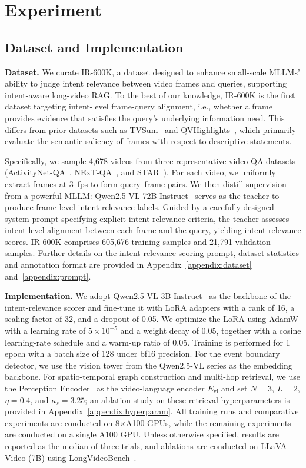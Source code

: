\section{Experiment}


\subsection{Dataset and Implementation}
\noindent\textbf{Dataset.} We curate IR-600K, a  dataset designed to enhance small-scale MLLMs’ ability to judge intent relevance between video frames and queries, supporting intent-aware long-video RAG. To the best of our knowledge, IR-600K is the first dataset targeting intent-level frame-query alignment, i.e., whether a frame provides evidence that satisfies the query’s underlying information need. This differs from prior datasets such as TVSum~\cite{tvs} and QVHighlights~\cite{qah}, which primarily evaluate the semantic saliency of frames with respect to descriptive statements. 

Specifically, we sample 4,678 videos from three representative video QA datasets (ActivityNet-QA~\cite{A-QA}, NExT-QA~\cite{N-QA}, and STAR~\cite{S-QA}).
For each video, we uniformly extract frames at 3~fps to form query--frame pairs. We then distill supervision from a powerful MLLM: Qwen2.5-VL-72B-Instruct~\cite{bai2025qwen2} serves as the teacher to produce frame-level intent-relevance labels. Guided by a carefully designed system prompt specifying explicit intent-relevance criteria, the teacher assesses intent-level alignment between each frame and the query, yielding intent-relevance scores. IR-600K comprises 605,676 training samples and 21,791 validation samples. Further details on the intent-relevance scoring prompt, dataset statistics and annotation format are provided in Appendix~\ref{appendix:dataset} and~\ref{appendix:prompt}. 


\noindent\textbf{Implementation.} We adopt Qwen2.5-VL-3B-Instruct~\cite{bai2025qwen2} as the backbone of the intent-relevance scorer and fine-tune it with LoRA adapters with a rank of 16, a scaling factor of 32, and a dropout of 0.05. We optimize the LoRA using AdamW with a learning rate of $5\times10^{-5}$ and a weight decay of 0.05, together with a cosine learning-rate schedule and a warm-up ratio of 0.05. Training is performed for 1 epoch with a batch size of 128 under bf16 precision. For the event boundary detector, we use the vision tower from the Qwen2.5-VL series as the embedding backbone. For spatio-temporal graph construction and multi-hop retrieval, we use the Perception Encoder~\cite{perceptionenc} as the video-language encoder $E_{\mathrm{vl}}$ and set $N=3$, $L=2$, $\eta=0.4$, and $\kappa_s=3.25$; an ablation study on these retrieval hyperparameters is provided in Appendix~\ref{appendix:hyperparam}. All training runs  and comparative experiments are conducted on 8$\times$A100 GPUs, while the remaining experiments are conducted on a single A100 GPU. Unless otherwise specified, results are reported as the median of three trials, and ablations are conducted on LLaVA-Video (7B) using LongVideoBench~\cite{lvb}.

